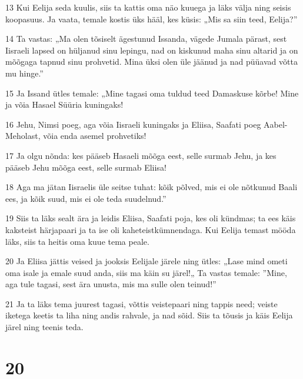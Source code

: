 \par 13 Kui Eelija seda kuulis, siis ta kattis oma näo kuuega ja läks välja ning seisis koopasuus. Ja vaata, temale kostis üks hääl, kes küsis: „Mis sa siin teed, Eelija?”
\par 14 Ta vastas: „Ma olen tõsiselt ägestunud Issanda, vägede Jumala pärast, sest Iisraeli lapsed on hüljanud sinu lepingu, nad on kiskunud maha sinu altarid ja on mõõgaga tapnud sinu prohvetid. Mina üksi olen üle jäänud ja nad püüavad võtta mu hinge.”
\par 15 Ja Issand ütles temale: „Mine tagasi oma tuldud teed Damaskuse kõrbe! Mine ja võia Hasael Süüria kuningaks!
\par 16 Jehu, Nimsi poeg, aga võia Iisraeli kuningaks ja Eliisa, Saafati poeg Aabel-Meholast, võia enda asemel prohvetiks!
\par 17 Ja olgu nõnda: kes pääseb Hasaeli mõõga eest, selle surmab Jehu, ja kes pääseb Jehu mõõga eest, selle surmab Eliisa!
\par 18 Aga ma jätan Iisraelis üle seitse tuhat: kõik põlved, mis ei ole nõtkunud Baali ees, ja kõik suud, mis ei ole teda suudelnud.”
\par 19 Siis ta läks sealt ära ja leidis Eliisa, Saafati poja, kes oli kündmas; ta ees käis kaksteist härjapaari ja ta ise oli kaheteistkümnendaga. Kui Eelija temast mööda läks, siis ta heitis oma kuue tema peale.
\par 20 Ja Eliisa jättis veised ja jooksis Eelijale järele ning ütles: „Lase mind ometi oma isale ja emale suud anda, siis ma käin su järel!„ Ta vastas temale: ”Mine, aga tule tagasi, sest ära unusta, mis ma sulle olen teinud!”
\par 21 Ja ta läks tema juurest tagasi, võttis veistepaari ning tappis need; veiste iketega keetis ta liha ning andis rahvale, ja nad sõid. Siis ta tõusis ja käis Eelija järel ning teenis teda.

\chapter{20}

